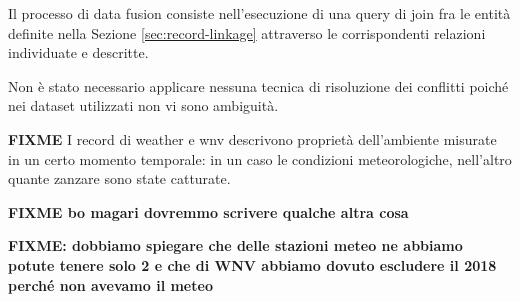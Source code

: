 Il processo di data fusion consiste nell'esecuzione di una query di join 
fra le entità definite nella Sezione \ref{sec:record-linkage} attraverso le 
corrispondenti relazioni individuate e descritte.

Non è stato necessario applicare nessuna tecnica di risoluzione dei conflitti 
poiché nei dataset utilizzati non vi sono ambiguità.

\textbf{FIXME} I record di weather e wnv descrivono proprietà dell'ambiente 
misurate in un certo momento temporale: in un caso le condizioni 
meteorologiche, nell'altro quante zanzare sono state catturate.

\textbf{FIXME bo magari dovremmo scrivere qualche altra cosa}

\textbf{FIXME: dobbiamo spiegare che delle stazioni meteo ne abbiamo potute 
tenere solo 2 e che di WNV abbiamo dovuto escludere il 2018 perché non avevamo 
il meteo}

